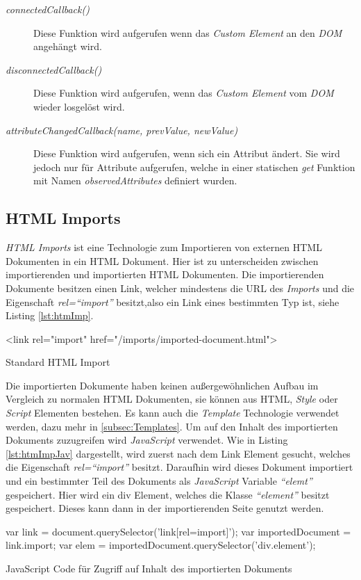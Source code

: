 \documentclass[12pt, paper=a4, bibtotoc, toc=listof]{scrreprt}
\begin{document}
			\begin{description}  
				\item  [\emph{connectedCallback()}] Diese Funktion wird aufgerufen wenn das \emph{Custom Element} an den \emph{\ac{DOM}} angehängt wird.
				\item [\emph{disconnectedCallback()}] Diese Funktion wird aufgerufen, wenn das \emph{Custom Element} vom \emph{\ac{DOM}} wieder losgelöst wird. 
				\item  [\emph{attributeChangedCallback(name, prevValue, newValue)}] Diese Funktion wird aufgerufen, wenn sich ein Attribut ändert. Sie wird jedoch nur für Attribute aufgerufen, welche in einer statischen \emph{get} Funktion mit Namen \emph{observedAttributes} definiert wurden.
			\end{description}
			\subsection{HTML Imports}
			\emph{\ac{HTML} Imports} ist eine Technologie zum Importieren von externen \ac{HTML} Dokumenten in ein \ac{HTML} Dokument. Hier ist zu unterscheiden zwischen importierenden und importierten \ac{HTML} Dokumenten. Die importierenden Dokumente besitzen einen Link, welcher mindestens die \ac{URL} des \emph{Imports} und die Eigenschaft \emph{rel=\enquote{import}} besitzt,also ein Link eines bestimmten Typ ist, siehe Listing \ref{lst:htmImp}. 
				\begin{listing}
				\begin{HTMLcode*}{}
 <link rel="import" href="/imports/imported-document.html">
				\end{HTMLcode*}
				\caption{Standard HTML Import}
				\label{lst:htmImp}
				\end{listing}
			Die importierten Dokumente haben keinen außergewöhnlichen Aufbau im Vergleich zu normalen \ac{HTML} Dokumenten, sie können aus \ac{HTML}, \emph{Style} oder \emph{Script} Elementen bestehen. Es kann auch die \emph{Template} Technologie verwendet werden, dazu mehr in \ref{subsec:Templates}.
			Um auf den Inhalt des importierten Dokuments zuzugreifen wird \emph{JavaScript} verwendet. Wie in Listing \ref{lst:htmImpJav} dargestellt, wird zuerst nach dem Link Element gesucht, welches die Eigenschaft \emph{rel=\enquote{import}} besitzt. Daraufhin wird dieses Dokument importiert und ein bestimmter Teil des Dokuments als \emph{JavaScript} Variable \emph{\enquote{elemt}} gespeichert. Hier wird ein \ac{div} Element, welches die Klasse \emph{\enquote{element}} besitzt gespeichert. Dieses kann dann in der importierenden Seite genutzt werden. 
			\begin{listing}
			\begin{JavaScriptcode*}{}
var link = document.querySelector('link[rel=import]');
var importedDocument = link.import;
var elem = importedDocument.querySelector('div.element');
			\end{JavaScriptcode*}
			\caption{JavaScript Code für Zugriff auf Inhalt des importierten Dokuments}
			\label{lst:htmImpJav}
			\end{listing} 
			
\end{document}
